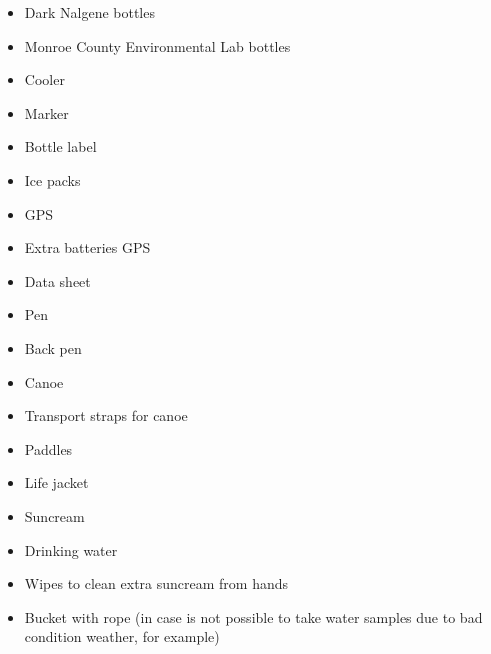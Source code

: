 \begin{appendices}
\begin{multicols}{3}
\begin{itemize}
  \item Dark Nalgene bottles
  \item Monroe County Environmental Lab bottles
  \item Cooler
  \item Marker
  \item Bottle label
  \item Ice packs
  \item GPS
  \item Extra batteries GPS
  \item Data sheet
  \item Pen
  \item Back pen
  \item Canoe 
  \item Transport straps for canoe
  \item Paddles
  \item Life jacket
  \item Suncream 
  \item Drinking water
  \item Wipes to clean extra suncream from hands
  \item Bucket with rope (in case is not possible to take water samples due to bad condition weather, for example)
\end{itemize}
\end{multicols}



\end{appendices}
